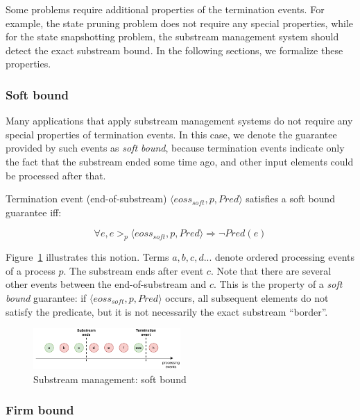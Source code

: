 Some problems require additional properties of the termination events. For example, the state pruning problem does not require any special properties, while for the state snapshotting problem, the substream management system should detect the exact substream bound. In the following sections, we formalize these properties. 

\subsubsection{Soft bound}

Many applications that apply substream management systems do not require any special properties of termination events. In this case, we denote the guarantee provided by such events as {\em soft bound}, because termination events indicate only the fact that the substream ended some time ago, and other input elements could be processed after that.

\begin{definition}
Termination event (end-of-substream) $\langle eoss_{soft}, p, Pred\rangle$ satisfies a soft bound guarantee iff:

\begin{equation}
\forall e, e >_p \langle eoss_{soft}, p, Pred\rangle \Rightarrow \neg Pred(e)
\end{equation}
\end{definition}

Figure~\ref{general_guarantees} illustrates this notion. Terms $a,b,c,d...$ denote ordered processing events of a process $p$. The substream ends after event $c$. Note that there are several other events between the end-of-substream and $c$. This is the property of a {\em soft bound} guarantee: if $\langle eoss_{soft}, p, Pred\rangle$ occurs, all subsequent elements do not satisfy the predicate, but it is not necessarily the exact substream ``border''.

\begin{figure}[t]
  \centering
  \includegraphics[width=0.50\textwidth]{pics/general-guarantee.pdf}
  \caption{Substream management: soft bound}
  \label{general_guarantees}
\end{figure}

\subsubsection{Firm bound}

